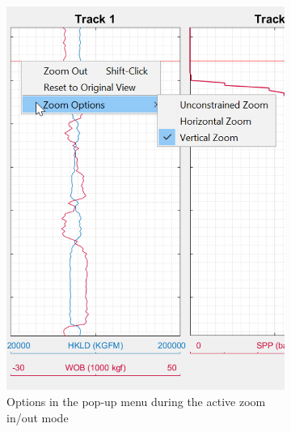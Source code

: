 \documentclass[12pt,a4paper,oneside]{report}
\begin{document}
\begin{figure}[ht]
\centering
\begin{subfigure}[b]{0.45\textwidth}
    \includegraphics[width=\textwidth]{fig/zoom.png}
    \caption{Options in the pop-up menu during the active zoom in/out mode}
\end{subfigure}
\hfill
  \begin{subfigure}[b]{0.45\textwidth}

\end{subfigure}
\end{figure}
\end{document}
